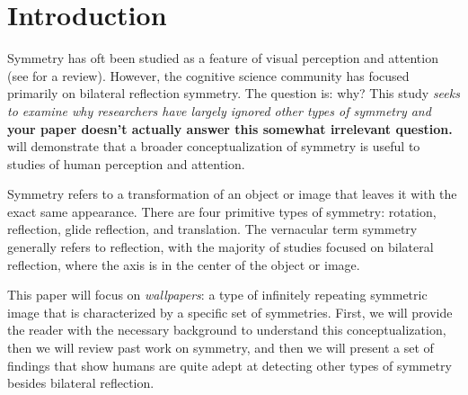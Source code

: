 \section{Introduction}
Symmetry has oft been studied as a feature of visual perception and attention (see \citet{review} for a review). However,  the cognitive science community has focused primarily on bilateral reflection symmetry. The question is: why? This study 
% 
{\it seeks to examine why researchers have largely ignored other types of symmetry and }{\bf your paper doesn't actually answer this somewhat irrelevant question.}
will demonstrate that a broader conceptualization of symmetry is useful to studies of human perception and attention.

Symmetry refers to a transformation of an object or image that leaves it with the exact same appearance. There are four primitive types of symmetry: rotation, reflection, glide reflection, and translation. The vernacular term symmetry generally refers to reflection, with the majority of studies focused on bilateral reflection, where the axis is in the center of the object or image.

This paper will focus on \textit{wallpapers}: a type of infinitely repeating symmetric image that is characterized by a specific set of symmetries. First, we will provide the reader with the necessary background to understand this conceptualization, then we will review past work on symmetry, and then we will present a set of findings that show humans are quite adept at detecting other types of symmetry besides bilateral reflection.



